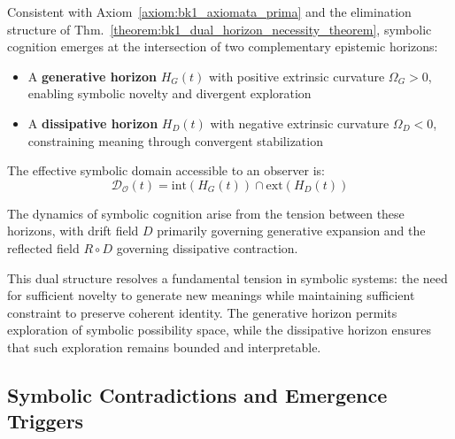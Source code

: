 \begin{axiom}
\label{axiom:bk1_dual_horizon_postulate}
Consistent with Axiom~\ref{axiom:bk1_axiomata_prima} and the elimination structure of Thm.~\ref{theorem:bk1_dual_horizon_necessity_theorem}, symbolic cognition emerges at the intersection of two complementary epistemic horizons:
\begin{itemize}
    \item A \textbf{generative horizon} $H_G(t)$ with positive extrinsic curvature $\Omega_G > 0$, enabling symbolic novelty and divergent exploration
    \item A \textbf{dissipative horizon} $H_D(t)$ with negative extrinsic curvature $\Omega_D < 0$, constraining meaning through convergent stabilization
\end{itemize}

The effective symbolic domain accessible to an observer is:
\[
\mathcal{D}_\mathcal{O}(t) = \text{int}(H_G(t)) \cap \text{ext}(H_D(t))
\]

The dynamics of symbolic cognition arise from the tension between these horizons, with drift field $D$ primarily governing generative expansion and the reflected field $R \circ D$ governing dissipative contraction.
\end{axiom}

This dual structure resolves a fundamental tension in symbolic systems: the need for sufficient novelty to generate new meanings while maintaining sufficient constraint to preserve coherent identity. The generative horizon permits exploration of symbolic possibility space, while the dissipative horizon ensures that such exploration remains bounded and interpretable.

\subsection{Symbolic Contradictions and Emergence Triggers}
\label{subsec:bk1_contradictions_emergence_triggers}

